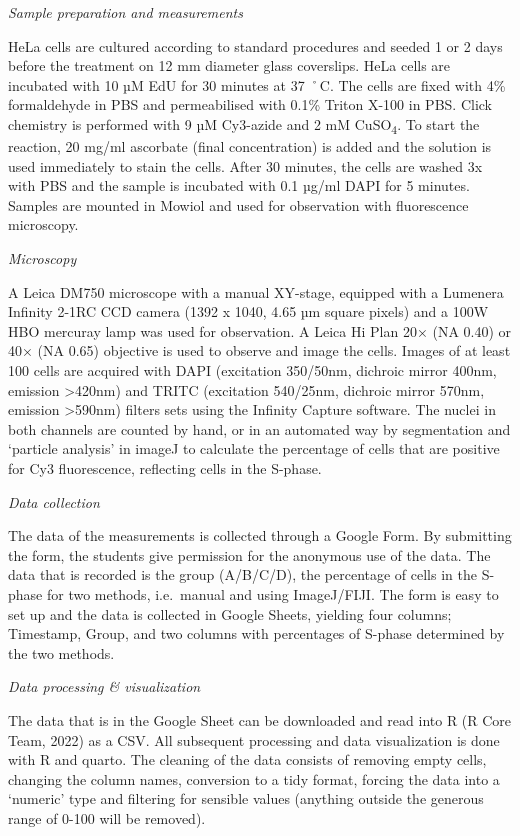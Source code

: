 \documentclass[
]{agujournal2019}
\begin{document}
\emph{Sample preparation and measurements}

HeLa cells are cultured according to standard procedures and seeded 1 or
2 days before the treatment on 12 mm diameter glass coverslips. HeLa
cells are incubated with 10 µM EdU for 30 minutes at 37 ˚C. The cells
are fixed with 4\% formaldehyde in PBS and permeabilised with 0.1\%
Triton X-100 in PBS. Click chemistry is performed with 9 µM Cy3-azide
and 2 mM CuSO\textsubscript{4}. To start the reaction, 20 mg/ml
ascorbate (final concentration) is added and the solution is used
immediately to stain the cells. After 30 minutes, the cells are washed
3x with PBS and the sample is incubated with 0.1 µg/ml DAPI for 5
minutes. Samples are mounted in Mowiol and used for observation with
fluorescence microscopy.

\emph{Microscopy}

A Leica DM750 microscope with a manual XY-stage, equipped with a
Lumenera Infinity 2-1RC CCD camera (1392 x 1040, 4.65 µm square pixels)
and a 100W HBO mercuray lamp was used for observation. A Leica Hi Plan
20× (NA 0.40) or 40× (NA 0.65) objective is used to observe and image
the cells. Images of at least 100 cells are acquired with DAPI
(excitation 350/50nm, dichroic mirror 400nm, emission \textgreater420nm)
and TRITC (excitation 540/25nm, dichroic mirror 570nm, emission
\textgreater590nm) filters sets using the Infinity Capture software. The
nuclei in both channels are counted by hand, or in an automated way by
segmentation and `particle analysis' in imageJ to calculate the
percentage of cells that are positive for Cy3 fluorescence, reflecting
cells in the S-phase.

\emph{Data collection}

The data of the measurements is collected through a Google Form. By
submitting the form, the students give permission for the anonymous use
of the data. The data that is recorded is the group (A/B/C/D), the
percentage of cells in the S-phase for two methods, i.e.~manual and
using ImageJ/FIJI. The form is easy to set up and the data is collected
in Google Sheets, yielding four columns; Timestamp, Group, and two
columns with percentages of S-phase determined by the two methods.

\emph{Data processing \& visualization}

The data that is in the Google Sheet can be downloaded and read into R
(R Core Team, 2022) as a CSV. All subsequent processing and data
visualization is done with R and quarto. The cleaning of the data
consists of removing empty cells, changing the column names, conversion
to a tidy format, forcing the data into a `numeric' type and filtering
for sensible values (anything outside the generous range of 0-100 will
be removed).
\end{document}
